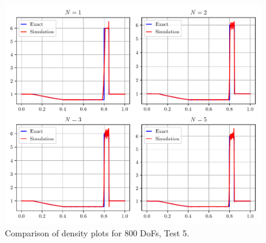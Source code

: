 \documentclass[a4paper,11pt,oneside]{article}
\begin{document}
\begin{figure}[htbp]
	\includegraphics[width=\linewidth]{figures/riemann_1d/test1-5/dof800_12_12_chandrashekhar.pdf}
	\caption{Comparison of density plots for 800 DoFs, Test 5.}
	\label{fig:test1-5_dof800_chandrashekhar}
\end{figure}
\end{document}
